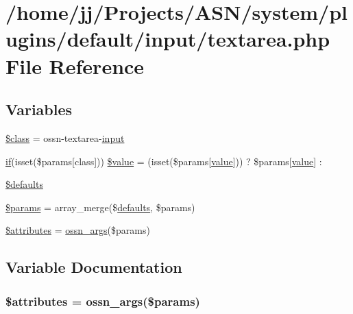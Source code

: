 \hypertarget{textarea_8php}{}\section{/home/jj/\+Projects/\+A\+S\+N/system/plugins/default/input/textarea.php File Reference}
\label{textarea_8php}
\subsection*{Variables}
\begin{DoxyCompactItemize}
\item 
\hyperlink{textarea_8php_a252ba022809910ea710a068fc1bab657}{\$class} = \textquotesingle{}ossn-\/textarea-\/\hyperlink{ossn_8lib_8input_8php_a64ebee98b041c4f75f71ed3cd73cc8ed}{input}\textquotesingle{}
\item 
\hyperlink{jquery_8tokeninput_8js_ad8dd46a3cbc004569e34401e9e71771a}{if}(isset(\$params\mbox{[}\textquotesingle{}class\textquotesingle{}\mbox{]})) \hyperlink{textarea_8php_a5bd63f8afd4dd4ba86dcdf5618904298}{\$value} = (isset(\$params\mbox{[}\textquotesingle{}\hyperlink{fullpage_2plugin_8min_8js_ac56c57897e10f699d124e0103921aa20}{value}\textquotesingle{}\mbox{]})) ? \$params\mbox{[}\textquotesingle{}\hyperlink{fullpage_2plugin_8min_8js_ac56c57897e10f699d124e0103921aa20}{value}\textquotesingle{}\mbox{]} \+: \textquotesingle{}\textquotesingle{}
\item 
\hyperlink{textarea_8php_a34ddfd723e30abea0a92b81f4443ac6a}{\$defaults}
\item 
\hyperlink{textarea_8php_afe68e6fbe7acfbffc0af0c84a1996466}{\$params} = array\+\_\+merge(\$\hyperlink{_chart_8_core_8js_afbaa35e32dd50615b39a75e1e5ec6921}{defaults}, \$params)
\item 
\hyperlink{textarea_8php_adc851f7a62250e75df0490c0280aef4c}{\$attributes} = \hyperlink{ossn_8lib_8views_8php_a90922f09de8a06ea85351afb51fac9f7}{ossn\+\_\+args}(\$params)
\end{DoxyCompactItemize}


\subsection{Variable Documentation}
\subsubsection[{\texorpdfstring{\$attributes}{$attributes}}]{\setlength{\rightskip}{0pt plus 5cm}\$attributes = {\bf ossn\+\_\+args}(\$params)}\hypertarget{textarea_8php_adc851f7a62250e75df0490c0280aef4c}{}\label{textarea_8php_adc851f7a62250e75df0490c0280aef4c}


